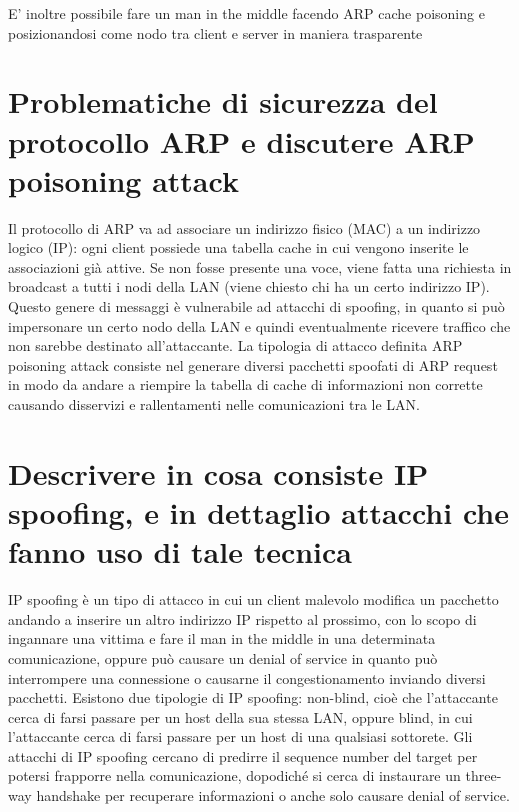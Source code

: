 \documentclass{report}
\begin{document}
E' inoltre possibile fare un man in the middle facendo ARP cache poisoning e posizionandosi come nodo
tra client e server in maniera trasparente

\section{Problematiche di sicurezza del protocollo ARP e discutere ARP poisoning attack}
Il protocollo di ARP va ad associare un indirizzo fisico (MAC) a un indirizzo logico (IP): ogni client possiede una tabella cache in cui vengono inserite le associazioni già attive. Se non fosse presente una voce, viene fatta una richiesta in broadcast a tutti i nodi della LAN (viene chiesto chi ha un certo indirizzo IP).
Questo genere di messaggi è vulnerabile ad attacchi di spoofing, in quanto si può impersonare un certo nodo della LAN e quindi eventualmente ricevere traffico che non sarebbe destinato all’attaccante.
La tipologia di attacco definita ARP poisoning attack consiste nel generare diversi pacchetti spoofati di ARP request in modo da andare a riempire la tabella di cache di informazioni non corrette causando disservizi e rallentamenti nelle comunicazioni tra le LAN.

\section{Descrivere in cosa consiste IP spoofing, e in dettaglio attacchi che fanno uso di tale tecnica}
IP spoofing è un tipo di attacco in cui un client malevolo modifica un pacchetto andando a inserire un altro indirizzo IP rispetto al prossimo, con lo scopo di ingannare una vittima e fare il man in the middle in una determinata comunicazione, oppure può causare un denial of service in quanto può interrompere una connessione o causarne il congestionamento inviando diversi pacchetti.
Esistono due tipologie di IP spoofing: non-blind, cioè che l'attaccante cerca di farsi passare per un host della sua stessa LAN, oppure blind, in cui l’attaccante cerca di farsi passare per un host di una qualsiasi sottorete.
Gli attacchi di IP spoofing cercano di predirre il sequence number del target per potersi frapporre nella comunicazione, dopodiché si cerca di instaurare un three-way handshake per recuperare informazioni o anche solo causare denial of service.
\end{document}
